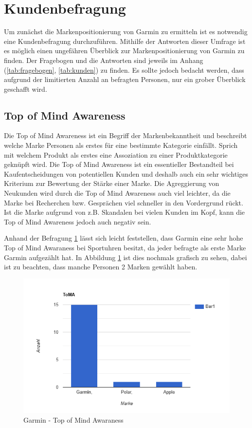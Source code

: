 \section{Kundenbefragung} \label{sec:befragung}

Um zunächst die Markenpositionierung von Garmin zu ermitteln ist es notwendig eine Kundenbefragung durchzuführen. Mithilfe der Antworten dieser Umfrage ist es möglich einen ungefähren Überblick zur Markenpositionierung von Garmin zu finden. Der Fragebogen und die Antworten sind jeweils im Anhang (\ref{tab:fragebogen}, \ref{tab:kunden}) zu finden. Es sollte jedoch bedacht werden, dass aufgrund der limitierten Anzahl an befragten Personen, nur ein grober Überblick geschafft wird.

\subsection{Top of Mind Awareness}
Die Top of Mind Awareness  ist ein Begriff der Markenbekanntheit und beschreibt welche Marke Personen als erstes für eine bestimmte Kategorie einfällt. Sprich mit welchem Produkt als erstes eine Assoziation zu einer Produktkategorie geknüpft wird. Die Top of Mind Awareness ist ein essentieller Bestandteil bei Kaufentscheidungen von potentiellen Kunden und deshalb auch ein sehr wichtiges Kriterium zur Bewertung der Stärke einer Marke. Die Agreggierung von Neukunden wird durch die Top of Mind Awareness auch viel leichter, da die Marke bei Recherchen bzw. Gesprächen viel schneller in den Vordergrund rückt. Ist die Marke aufgrund von z.B. Skandalen bei vielen Kunden im Kopf, kann die Top of Mind Awareness jedoch auch negativ sein.  \cite{ToMA-1} \cite{ToMA-2}

Anhand der Befragung \ref{sec:befragung} lässt sich leicht feststellen, dass Garmin eine sehr hohe Top of Mind Awaraness bei Sportuhren besitzt, da jeder befragte als erste Marke Garmin aufgezählt hat. In Abbildung \ref{fig:toMa} ist dies nochmals grafisch zu sehen, dabei ist zu beachten, dass manche Personen 2 Marken gewählt haben. 


\begin{figure}[H]
    \centering
    \includegraphics[width=0.7\linewidth]{Figure/ToMA.png}
    \caption{Garmin - Top of Mind Awaraness}
    \label{fig:toMa}
\end{figure}


